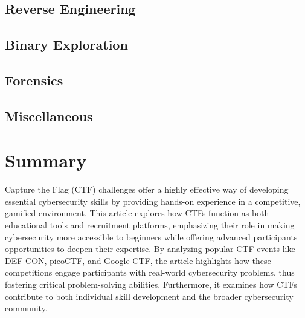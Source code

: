\documentclass[conference]{IEEEtran}
\begin{document}
\cite{morkel2005}

\cite{luciano1987}


\subsection{Reverse Engineering}

\subsection{Binary Exploration}

\subsection{Forensics}

\subsection{Miscellaneous}

\section{Summary}

Capture the Flag (CTF) challenges offer a highly effective way of developing
essential cybersecurity skills by providing hands-on experience in a
competitive, gamified environment. This article explores how CTFs function as
both educational tools and recruitment platforms, emphasizing their role in
making cybersecurity more accessible to beginners while offering advanced
participants opportunities to deepen their expertise. By analyzing popular CTF
events like DEF CON, picoCTF, and Google CTF, the article highlights how these
competitions engage participants with real-world cybersecurity problems, thus
fostering critical problem-solving abilities. Furthermore, it examines how CTFs
contribute to both individual skill development and the broader cybersecurity
community.



\end{document}
